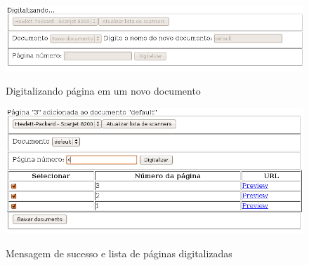 \begin{figure}[ht]
\begin{center}
\scalebox{0.5} {
    \includegraphics{imagens/digitalizando.png}}
\end{center}
  \caption{Digitalizando página em um novo documento}
  \label{fig:urls}
\end{figure}

\begin{figure}[ht]
\begin{center}
\scalebox{0.5} {
    \includegraphics{imagens/digitalizado.png}}
\end{center}
  \caption{Mensagem de sucesso e lista de páginas digitalizadas}
  \label{fig:urls}
\end{figure}
